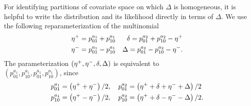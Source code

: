 \documentclass[11pt, sigconf, svgnames]{acmart}
\begin{document}
For identifying partitions of covariate space on which $\Delta$ is homogeneous, it is helpful to write the
distribution and its likelihood directly in terms of $\Delta$.  We use the
following reparameterization of the multinomial
\begin{align*}
  \eta^+ &= p_{01}^{a_1} + p_{10}^{a_1}  &\delta = p_{01}^{a_2} + p_{10}^{a_2} - \eta^+\\
  \eta^- &= p_{01}^{a_1} - p_{10}^{a_1}  &\Delta = p_{01}^{a_2} - p_{10}^{a_2} - \eta^- .
\end{align*}
The parameterization $(\eta^+, \eta^-, \delta, \Delta)$ is equivalent to \\
$(p_{01}^{a_1}, p_{10}^{a_1}, p_{01}^{a_1}, p_{10}^{a_1})$, since
\begin{align*}
  p_{01}^{a_1} &= \left(\eta^+ + \eta^-\right)/2, \quad
  p_{01}^{a_2} = \left(\eta^+ + \delta + \eta^- + \Delta\right)/2\\
  p_{10}^{a_1} &= \left(\eta^+ - \eta^-\right)/2, \quad
  p_{10}^{a_2} = \left(\eta^+ + \delta - \eta^- - \Delta\right)/2.
\end{align*}

\vspace{2em}
\end{document}

